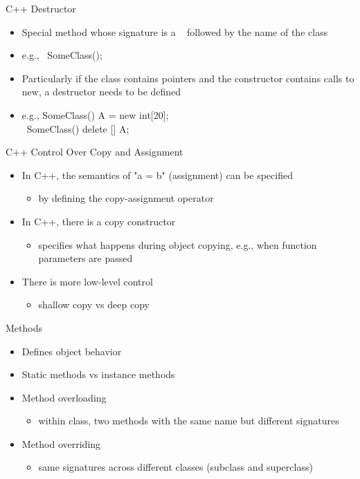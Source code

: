 \documentclass{beamer}
\begin{document}
\begin{frame}{C++ Destructor}
\begin{itemize}
\item Special method whose signature is a ~ followed by the name of the class
\item e.g., ~SomeClass();
\item Particularly if the class contains pointers and the constructor contains calls to new, a destructor needs to be defined
\item e.g.,  SomeClass() { A = new int[20]; } \\
         ~SomeClass() { delete [] A; }
\end{itemize}
\end{frame}

\begin{frame}{C++ Control Over Copy and Assignment}
\begin{itemize}
\item In C++, the semantics of "a = b" (assignment) can be specified
\begin{itemize}
\item by defining the copy-assignment operator
\end{itemize}
\item In C++, there is a copy constructor
\begin{itemize}
\item specifies what happens during object copying, e.g., when function parameters are passed
\end{itemize}
\item There is more low-level control
\begin{itemize}
\item shallow copy vs deep copy
\end{itemize}
\end{itemize}
\end{frame}

\begin{frame}{Methods}
\begin{itemize}
\item Defines object behavior
\item Static methods vs instance methods
\item Method overloading
\begin{itemize}
\item within class, two methods with the same name but different signatures
\end{itemize}
\item Method overriding
\begin{itemize}
\item same signatures across different classes (subclass and superclass)
\end{itemize}
\end{itemize}
\end{frame}
\end{document}
